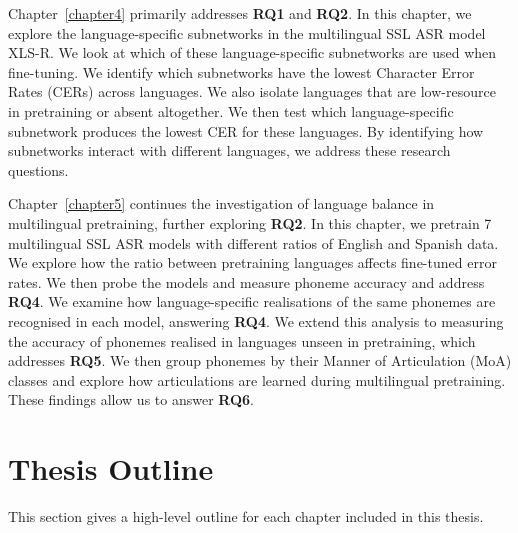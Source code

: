 

Chapter~\ref{chapter4} primarily addresses \textbf{RQ1} and \textbf{RQ2}. In this chapter, we explore the language-specific subnetworks in the multilingual SSL ASR model XLS-R. We look at which of these language-specific subnetworks are used when fine-tuning. We identify which subnetworks have the lowest Character Error Rates (CERs) across languages. We also isolate languages that are low-resource in pretraining or absent altogether. We then test which language-specific subnetwork produces the lowest CER for these languages. By identifying how subnetworks interact with different languages, we address these research questions. 

Chapter~\ref{chapter5} continues the investigation of language balance in multilingual pretraining, further exploring \textbf{RQ2}. In this chapter, we pretrain 7 multilingual SSL ASR models with different ratios of English and Spanish data. We explore how the ratio between pretraining languages affects fine-tuned error rates. We then probe the models and measure phoneme accuracy and address \textbf{RQ4}. We examine how language-specific realisations of the same phonemes are recognised in each model, answering \textbf{RQ4}. We extend this analysis to measuring the accuracy of phonemes realised in languages unseen in pretraining, which addresses \textbf{RQ5}. We then group phonemes by their Manner of Articulation (MoA) classes and explore how articulations are learned during multilingual pretraining. These findings allow us to answer \textbf{RQ6}.

\newpage
\section{Thesis Outline}
This section gives a high-level outline for each chapter included in this thesis. 

